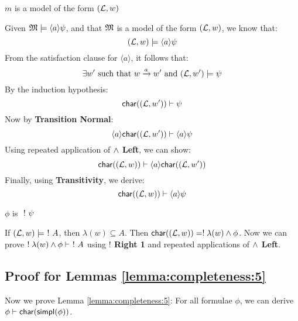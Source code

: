 \begin{subcase}
 $m$ is a  model of the form $(\mathcal{L},w)$
 \end{subcase}
Given $\frak{M} \models \langle a \rangle \psi$, and that $\frak{M}$ is a  model of the form $(\mathcal{L},w)$, we know that:
\[
(\mathcal{L},w) \models \langle a \rangle \psi
\]
From the satisfaction clause for $\langle a \rangle$, it follows that:
\[
\exists w' \mbox{ such that } w \xrightarrow{a} w' \mbox { and } (\mathcal{L},w') \models \psi
\]
By the induction hypothesis:
\[
 \mathsf{char}((\mathcal{L},w')) \vdash \psi
\]
Now by {\bf Transition Normal}:
\[
\langle a \rangle  \mathsf{char}((\mathcal{L},w')) \vdash \langle a \rangle \psi
\]
Using repeated application of {\bf $\land$ Left}, we can show:
\[
 \mathsf{char}((\mathcal{L},w)) \vdash \langle a \rangle  \mathsf{char}((\mathcal{L},w'))
\]
Finally, using {\bf Transitivity}, we derive:
\[
 \mathsf{char}((\mathcal{L},w)) \vdash  \langle a \rangle \psi
\]
\begin{mycase}
$\phi$ is $\ ! \  \psi$
\end{mycase}
If $(\mathcal{L},w) \models \ ! \  A$, then $\lambda(w) \subseteq A$.
Then $ \mathsf{char}((\mathcal{L},w)) = ! \; \lambda(w) \land \phi$.
Now we can prove $! \; \lambda(w) \land \phi \vdash \ ! \  A$ using  {\bf $!$ Right 1} and repeated applications of {\bf $\land$ Left}.


\subsection{Proof for Lemmas \ref{lemma:completeness:5}}

Now we prove Lemma \ref{lemma:completeness:5}: 
For all formulae $\phi$, we can derive $\phi \vdash \mathsf{char}(\mathsf{simpl}(\phi))$.


